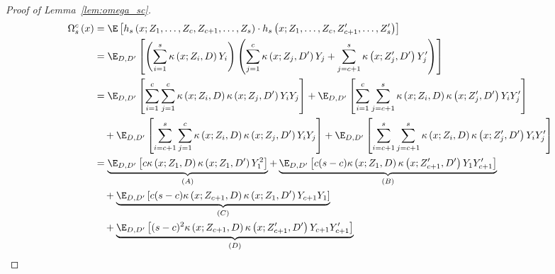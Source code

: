 \begin{proof}[Proof of Lemma~\ref{lem:omega_sc}]
	\begin{equation}
		\begin{aligned}
			\Omega_{s}^{c}\left(x\right)
			 & = \E\left[h_{s}\left(x; Z_1, \ldots, Z_{c}, Z_{c+1}, \ldots, Z_{s}\right) \cdot
			h_{s}\left(x; Z_1, \ldots,Z_{c}, Z_{c+1}^{\prime}, \ldots, Z_{s}^{\prime}\right)\right]                                                                \\
			 & = \E_{D, D^{\prime}}\left[
				\left(\sum_{i = 1}^{s}\kappa\left(x; Z_{i}, D\right)Y_{i}\right)
				\left(\sum_{j = 1}^{c}\kappa\left(x; Z_{j}, D^{\prime}\right)Y_{j}
				+ \sum_{j = c+1}^{s}\kappa\left(x; Z_{j}^{\prime}, D^{\prime}\right)Y_{j}^{\prime}\right)
			\right]                                                                                                                                                                                             \\
			 & = \E_{D, D^{\prime}}\left[\sum_{i = 1}^{c}\sum_{j = 1}^{c}\kappa\left(x; Z_{i}, D\right)\kappa\left(x; Z_{j}, D^{\prime}\right)Y_{i}Y_{j}\right]
			+  \E_{D, D^{\prime}}\left[\sum_{i = 1}^{c}\sum_{j = c+1}^{s}\kappa\left(x; Z_{i}, D\right)\kappa\left(x; Z_{j}^{\prime}, D^{\prime}\right)Y_{i}Y_{j}^{\prime}\right]   \\
			 & \quad + \E_{D, D^{\prime}}\left[\sum_{i = c+1}^{s}\sum_{j = 1}^{c}\kappa\left(x; Z_{i}, D\right)\kappa\left(x; Z_{j}, D^{\prime}\right)Y_{i}Y_{j}\right]
			+  \E_{D, D^{\prime}}\left[\sum_{i = c+1}^{s}\sum_{j = c+1}^{s}\kappa\left(x; Z_{i}, D\right)\kappa\left(x; Z_{j}^{\prime}, D^{\prime}\right)Y_{i}Y_{j}^{\prime}\right] \\
			 & = \underbrace{\E_{D, D^{\prime}}\left[c \kappa\left(x; Z_{1}, D\right)\kappa\left(x; Z_{1}, D^{\prime}\right)Y_{1}^{2}\right]}_{(A)}
			+ \underbrace{\E_{D, D^{\prime}}\left[c(s-c) \kappa\left(x; Z_{1}, D\right)\kappa\left(x; Z_{c+1}^{\prime}, D^{\prime}\right)Y_{1}Y_{c+1}^{\prime}\right]}_{(B)}                           \\
			 & \quad + \underbrace{\E_{D, D^{\prime}}\left[c(s-c) \kappa\left(x; Z_{c+1}, D\right)\kappa\left(x; Z_{1}, D^{\prime}\right)Y_{c+1}Y_{1}\right]}_{(C)}                                    \\
			 & \quad + \underbrace{\E_{D, D^{\prime}}\left[(s-c)^2 \kappa\left(x; Z_{c+1}, D\right)\kappa\left(x; Z_{c+1}^{\prime}, D^{\prime}\right)Y_{c+1}Y_{c+1}^{\prime}\right]}_{(D)}
		\end{aligned}

\end{equation}
\end{proof}
